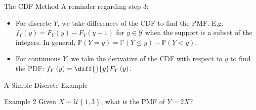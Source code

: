 \documentclass[10pt]{beamer}
\begin{document}
\begin{frame}[fragile]{The CDF Method}
A reminder regarding step 3:
\begin{itemize}[<+->]
    \item For discrete \(Y\), we take differences of the CDF to find the PMF. E.g. \(f_Y\left(y\right) = F_Y\left(y\right) - F_Y\left(y - 1\right)\) for \(y\in\mathcal{Y}\) when the support is a subset of the integers. In general, \(\mathbb{P}\left(Y = y\right) = \mathbb{P}\left(Y \leq y\right) - \mathbb{P}\left(Y < y\right)\).
    \item For continuous \(Y\), we take the derivative of the CDF with respect to \(y\) to find the PDF: \(f_Y\left(y\right) = \diff{}{y}F_Y\left(y\right)\).
\end{itemize}
\end{frame}

\begin{frame}[fragile]{A Simple Discrete Example}
\begin{exampleblock}{Example 2}
Given \(X \sim \mathcal{U}\left\{1, 3\right\}\), what is the PMF of \(Y = 2X\)?
\end{exampleblock}
\end{frame}
\end{document}
